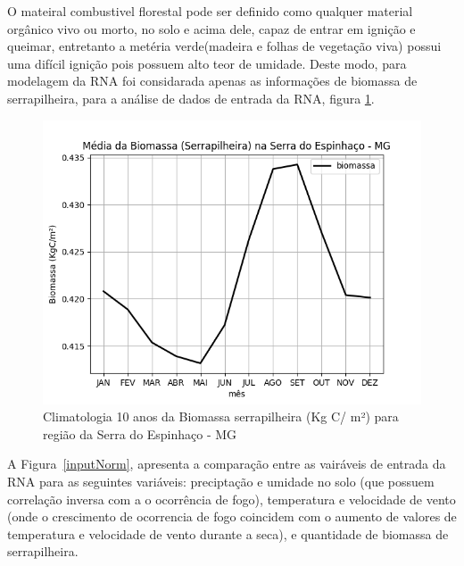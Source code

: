\documentclass[conference]{IEEEtran}
\begin{document}
O mateiral combustivel florestal pode ser definido como qualquer material orgânico vivo ou morto, no solo e acima dele, capaz de entrar em ignição e queimar, entretanto a metéria verde(madeira e folhas de vegetação viva) possui uma difícil ignição pois possuem alto teor de umidade. Deste modo, para modelagem da RNA foi considarada apenas as informações de biomassa de serrapilheira, para a análise de dados de entrada da RNA, figura \ref{inputBioLit}.\\
\begin{figure}[htbp]
\centerline{\includegraphics[width=0.4\paperwidth]{figuras/biomassa_litter.png}}
\caption{Climatologia 10 anos da Biomassa serrapilheira (Kg C/ m²) para região da Serra do Espinhaço - MG}
\label{inputBioLit}
\end{figure}
A Figura~\ref{inputNorm}, apresenta a comparação entre as vairáveis de entrada da RNA para as seguintes variáveis: preciptação e umidade no solo (que possuem correlação inversa com a o ocorrência de fogo), temperatura e velocidade de vento (onde o crescimento de ocorrencia de fogo coincidem com o aumento de valores de temperatura e velocidade de vento durante a seca), e quantidade de biomassa de serrapilheira.\\
\end{document}
